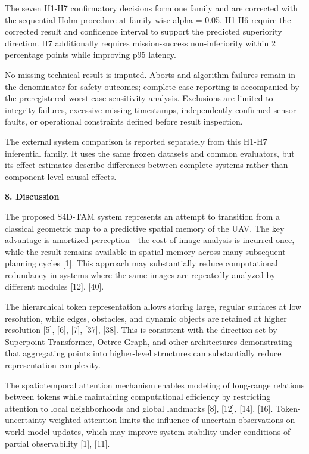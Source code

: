 \documentclass[
]{article}
\begin{document}
The seven H1-H7 confirmatory decisions form one family and are corrected
with the sequential Holm procedure at family-wise alpha = 0.05. H1-H6
require the corrected result and confidence interval to support the
predicted superiority direction. H7 additionally requires
mission-success non-inferiority within 2 percentage points while
improving p95 latency.

No missing technical result is imputed. Aborts and algorithm failures
remain in the denominator for safety outcomes; complete-case reporting
is accompanied by the preregistered worst-case sensitivity analysis.
Exclusions are limited to integrity failures, excessive missing
timestamps, independently confirmed sensor faults, or operational
constraints defined before result inspection.

The external system comparison is reported separately from this H1-H7
inferential family. It uses the same frozen datasets and common
evaluators, but its effect estimates describe differences between
complete systems rather than component-level causal effects.

\textbf{8. Discussion}

The proposed S4D-TAM system represents an attempt to transition from a
classical geometric map to a predictive spatial memory of the UAV. The
key advantage is amortized perception - the cost of image analysis is
incurred once, while the result remains available in spatial memory
across many subsequent planning cycles {[}1{]}. This approach may
substantially reduce computational redundancy in systems where the same
images are repeatedly analyzed by different modules {[}12{]}, {[}40{]}.

The hierarchical token representation allows storing large, regular
surfaces at low resolution, while edges, obstacles, and dynamic objects
are retained at higher resolution {[}5{]}, {[}6{]}, {[}7{]}, {[}37{]},
{[}38{]}. This is consistent with the direction set by Superpoint
Transformer, Octree-Graph, and other architectures demonstrating that
aggregating points into higher-level structures can substantially reduce
representation complexity.

The spatiotemporal attention mechanism enables modeling of long-range
relations between tokens while maintaining computational efficiency by
restricting attention to local neighborhoods and global landmarks
{[}8{]}, {[}12{]}, {[}14{]}, {[}16{]}. Token-uncertainty-weighted
attention limits the influence of uncertain observations on world model
updates, which may improve system stability under conditions of partial
observability {[}1{]}, {[}11{]}.
\end{document}
